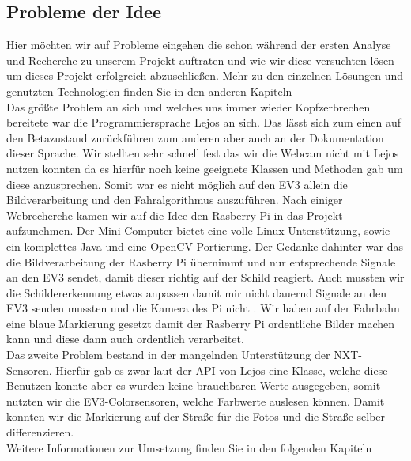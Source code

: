 \subsection{Probleme der Idee}
Hier möchten wir auf Probleme eingehen die schon während der ersten Analyse und Recherche zu unserem Projekt auftraten und wie wir diese versuchten lösen um dieses Projekt erfolgreich abzuschließen. Mehr zu den einzelnen Lösungen und genutzten Technologien finden Sie in den anderen Kapiteln\\
Das größte Problem an sich und welches uns immer wieder Kopfzerbrechen bereitete war die Programmiersprache Lejos an sich. Das lässt sich zum einen auf den Betazustand zurückführen zum anderen aber auch an der Dokumentation dieser Sprache. Wir stellten sehr schnell fest das wir die Webcam nicht mit Lejos nutzen konnten da es hierfür noch keine geeignete Klassen und Methoden gab um diese anzusprechen. Somit war es nicht möglich auf den EV3 allein die Bildverarbeitung und den Fahralgorithmus auszuführen. Nach einiger Webrecherche  kamen wir auf die Idee den Rasberry Pi in das Projekt aufzunehmen. Der Mini-Computer bietet eine volle Linux-Unterstützung, sowie ein komplettes Java und eine OpenCV-Portierung. Der Gedanke dahinter war das die Bildverarbeitung der Rasberry Pi übernimmt und nur entsprechende Signale an den EV3 sendet, damit dieser richtig auf der Schild reagiert. Auch mussten wir die Schildererkennung etwas anpassen damit mir nicht dauernd Signale an den EV3 senden mussten und die Kamera des Pi nicht . Wir haben auf der Fahrbahn eine blaue Markierung gesetzt damit der Rasberry Pi ordentliche Bilder machen kann und diese dann auch ordentlich verarbeitet.\\
Das zweite Problem bestand in der mangelnden Unterstützung der NXT-Sensoren. Hierfür gab es zwar laut der API von Lejos eine Klasse, welche diese Benutzen konnte aber es wurden keine brauchbaren Werte ausgegeben, somit nutzten wir die EV3-Colorsensoren, welche Farbwerte auslesen können. Damit konnten wir die Markierung auf der Straße für die Fotos und die Straße selber differenzieren. \\
Weitere Informationen zur Umsetzung finden Sie in den folgenden Kapiteln

